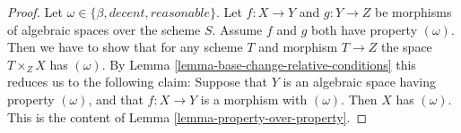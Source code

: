 \documentclass{stacks-project}
\theoremstyle{plain}
\theoremstyle{definition}
\theoremstyle{remark}
\numberwithin{equation}{subsection}
\begin{document}
\begin{proof}
Let $\omega \in \{\beta, decent, reasonable\}$.
Let $f : X \to Y$ and $g : Y \to Z$ be morphisms of algebraic spaces
over the scheme $S$. Assume $f$ and $g$ both have property
$(\omega)$. Then we have to show
that for any scheme $T$ and morphism $T \to Z$ the space $T \times_Z X$
has $(\omega)$. By
Lemma \ref{lemma-base-change-relative-conditions}
this reduces us to the following claim: Suppose that $Y$ is an algebraic
space having property $(\omega)$, and that $f : X \to Y$ is a morphism
with $(\omega)$. Then $X$ has $(\omega)$.
This is the content of Lemma \ref{lemma-property-over-property}.
\end{proof}
\end{document}
